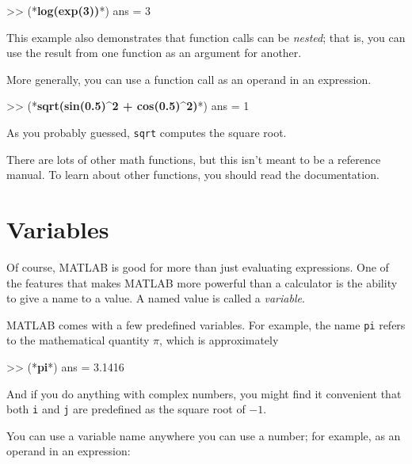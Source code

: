\begin{code}
>> (*\textbf{log(exp(3))}*)
ans = 3
\end{code}

This example also demonstrates that function calls can be \emph{nested};
that is, you can use the result from one function as an argument for
another.


More generally, you can use a function call as an operand in an expression.

\begin{code}
>> (*\textbf{sqrt(sin(0.5)\^{}2 + cos(0.5)\^{}2)}*)
ans = 1
\end{code}

As you probably guessed, \lstinline{sqrt} computes the square root.


There are lots of other math functions, but this isn't meant to
be a reference manual.  To learn about other functions, you should
read the documentation.


\section{Variables}

Of course, MATLAB is good for more than just evaluating expressions. One of the features that makes MATLAB more powerful than a calculator is the ability to give a name to a value.  A named value is called a \emph{variable}.

 
MATLAB comes with a few predefined variables. For
example, the name \lstinline{pi} refers to the
mathematical quantity $\pi$, which is approximately

\begin{code}
>> (*\textbf{pi}*)
ans = 3.1416
\end{code}

And if you do anything with complex numbers, you might find it
convenient that both \lstinline{i} and \lstinline{j} are predefined as the square
root of $-1$.


You can use a variable name anywhere you can use a number; for example, as
an operand in an expression:


